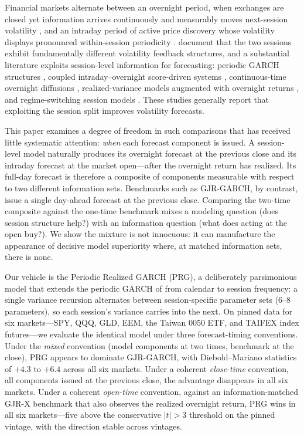 \documentclass[11pt,a4paper]{article}
\begin{document}
Financial markets alternate between an overnight period, when exchanges are closed yet information arrives continuously and measurably moves next-session volatility \citep{Tsiakas2008}, and an intraday period of active price discovery whose volatility displays pronounced within-session periodicity \citep{AndersenBollerslev1997}. \citet{Blanc2014} document that the two sessions exhibit fundamentally different volatility feedback structures, and a substantial literature exploits session-level information for forecasting: periodic GARCH structures \citep{Bollerslev1996}, coupled intraday--overnight score-driven systems \citep{Linton2020}, continuous-time overnight diffusions \citep{Kim2023}, realized-variance models augmented with overnight returns \citep{Todorova2014,Opschoor2021}, and regime-switching session models \citep{Lai2024}. These studies generally report that exploiting the session split improves volatility forecasts.

This paper examines a degree of freedom in such comparisons that has received little systematic attention: \emph{when} each forecast component is issued. A session-level model naturally produces its overnight forecast at the previous close and its intraday forecast at the market open---after the overnight return has realized. Its full-day forecast is therefore a composite of components measurable with respect to two different information sets. Benchmarks such as GJR-GARCH, by contrast, issue a single day-ahead forecast at the previous close. Comparing the two-time composite against the one-time benchmark mixes a modeling question (does session structure help?) with an information question (what does acting at the open buy?). We show the mixture is not innocuous: it can manufacture the appearance of decisive model superiority where, at matched information sets, there is none.

Our vehicle is the Periodic Realized GARCH (PRG), a deliberately parsimonious model that extends the periodic GARCH of \citet{Bollerslev1996} from calendar to session frequency: a single variance recursion alternates between session-specific parameter sets (6--8 parameters), so each session's variance carries into the next. On pinned data for six markets---SPY, QQQ, GLD, EEM, the Taiwan 0050 ETF, and TAIFEX index futures---we evaluate the identical model under three forecast-timing conventions. Under the \emph{mixed} convention (model components at two times, benchmark at the close), PRG appears to dominate GJR-GARCH, with Diebold--Mariano statistics of $+4.3$ to $+6.4$ across all six markets. Under a coherent \emph{close-time} convention, all components issued at the previous close, the advantage disappears in all six markets. Under a coherent \emph{open-time} convention, against an information-matched GJR-X benchmark that also observes the realized overnight return, PRG wins in all six markets---five above the conservative $|t|>3$ threshold on the pinned vintage, with the direction stable across vintages.
\end{document}
